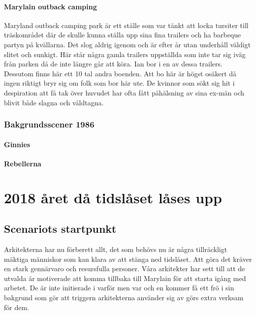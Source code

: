 \documentclass[a5paper,10pt]{report}
\begin{document}
\subsubsection{Marylain outback camping} \label{camping}
Maryland outback camping park är ett ställe som var tänkt att locka tursiter till träskområdet där de skulle kunna ställa upp sina fina trailers och ha barbeque partyn på kvällarna. Det slog aldrig igenom och är efter år utan underhåll väldigt slitet och sunkigt. Här står några gamla trailers uppställda som inte tar sig iväg från parken då de inte längre går att köra. Ian bor i en av dessa trailers. Dessutom finns här ett 10 tal andra boenden. Att bo här är högst osäkert då ingen riktigt bryr sig om folk som bor här ute. De kvinnor som sökt sig hit i despiration att få tak över huvudet har ofta fått påhälsning av sina ex-män och blivit både slagna och våldtagna.
\subsection{Bakgrundsscener 1986}
\subsubsection{Ginnies}
\subsubsection{Rebellerna}
\clearpage
\chapter{2018 året då tidslåset låses upp}
\section{Scenariots startpunkt}
Arkitekterna har nu förberett allt, det som behövs nu är några tillräckligt mäktiga människor som kan klara av att stänga ned tidslåset. Att göra det kräver en stark gennärvaro och resursfulla personer. Våra arkitekter har sett till att de utvalda är motiverade att komma tillbaka till Marylain för att starta igång med arbetet. De är inte initierade i varför men var och en kommer få ett frö i sin bakgrund som gör att triggern arkitekterna använder sig av görs extra verksam för dem.
\end{document}
